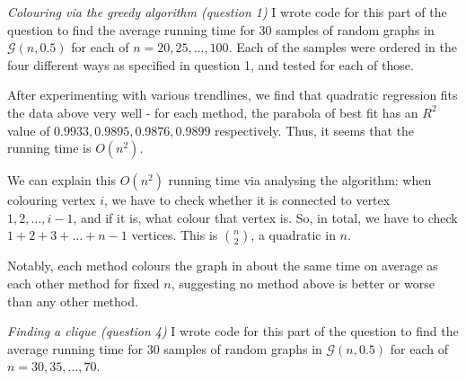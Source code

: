 \documentclass{article}
\begin{document}
\emph{Colouring via the greedy algorithm (question 1)} I wrote code for this part of the question to find the average running time for $30$ samples of random graphs in $\mathcal{G}(n,0.5)$ for each of $n=20,25,\dots,100$. Each of the samples were ordered in the four different ways as specified in question 1, and tested for each of those.

\begin{center}
 	
\end{center}

After experimenting with various trendlines, we find that quadratic regression fits the data above very well - for each method, the parabola of best fit has an $R^2$ value of $0.9933, 0.9895, 0.9876, 0.9899$ respectively. Thus, it seems that the running time is $O(n^2)$.

We can explain this $O(n^2)$ running time via analysing the algorithm: when colouring vertex $i$, we have to check whether it is connected to vertex $1,2,\dots,i-1$, and if it is, what colour that vertex is. So, in total, we have to check $1+2+3+\dots+n-1$ vertices. This is $\binom{n}{2}$, a quadratic in $n$.

Notably, each method colours the graph in about the same time on average as each other method for fixed $n$, suggesting no method above is better or worse than any other method.


\emph{Finding a clique (question 4)} I wrote code for this part of the question to find the average running time for $30$ samples of random graphs in $\mathcal{G}(n,0.5)$ for each of $n=30,35,\dots,70$.
\end{document}
